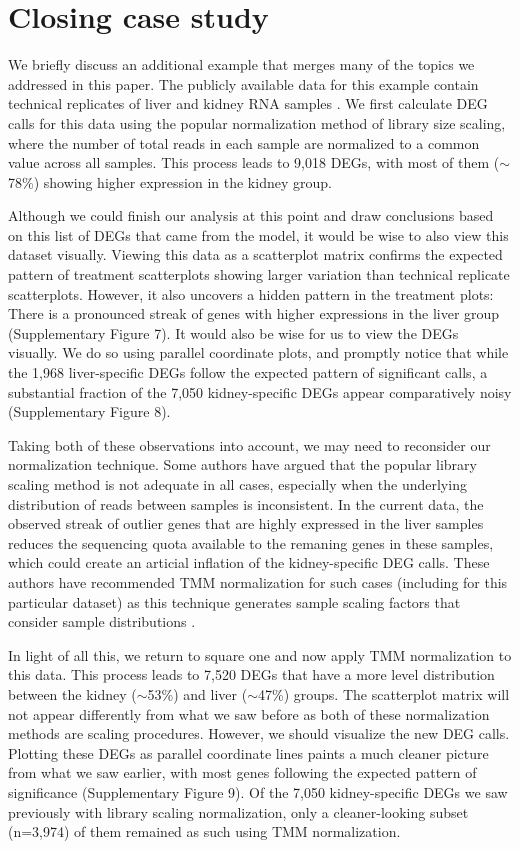 \documentclass{bioinfo}
\begin{document}
\section{Closing case study}

We briefly discuss an additional example that merges many of the topics we addressed in this paper. The publicly available data for this example contain technical replicates of liver and kidney RNA samples \citep{Marioni}. We first calculate DEG calls for this data using the popular normalization method of library size scaling, where the number of total reads in each sample are normalized to a common value across all samples. This process leads to 9,018 DEGs, with most of them ($\sim$78\%) showing higher expression in the kidney group.

Although we could finish our analysis at this point and draw conclusions based on this list of DEGs that came from the model, it would be wise to also view this dataset visually. Viewing this data as a scatterplot matrix confirms the expected pattern of treatment scatterplots showing larger variation than technical replicate scatterplots. However, it also uncovers a hidden pattern in the treatment plots: There is a pronounced streak of genes with higher expressions in the liver group (Supplementary Figure 7). It would also be wise for us to view the DEGs visually. We do so using parallel coordinate plots, and promptly notice that while the 1,968 liver-specific DEGs follow the expected pattern of significant calls, a substantial fraction of the 7,050 kidney-specific DEGs appear comparatively noisy (Supplementary Figure 8).

Taking both of these observations into account, we may need to reconsider our normalization technique. Some authors have argued that the popular library scaling method is not adequate in all cases, especially when the underlying distribution of reads between samples is inconsistent. In the current data, the observed streak of outlier genes that are highly expressed in the liver samples reduces the sequencing quota available to the remaning genes in these samples, which could create an articial inflation of the kidney-specific DEG calls. These authors have recommended TMM normalization for such cases (including for this particular dataset) as this technique generates sample scaling factors that consider sample distributions \citep{RobinsonOshlack}.

In light of all this, we return to square one and now apply TMM normalization to this data. This process leads to 7,520 DEGs that have a more level distribution between the kidney ($\sim$53\%) and liver ($\sim$47\%) groups. The scatterplot matrix will not appear differently from what we saw before as both of these normalization methods are scaling procedures. However, we should visualize the new DEG calls. Plotting these DEGs as parallel coordinate lines paints a much cleaner picture from what we saw earlier, with most genes following the expected pattern of significance (Supplementary Figure 9). Of the 7,050 kidney-specific DEGs we saw previously with library scaling normalization, only a cleaner-looking subset (n=3,974) of them remained as such using TMM normalization.
\end{document}
